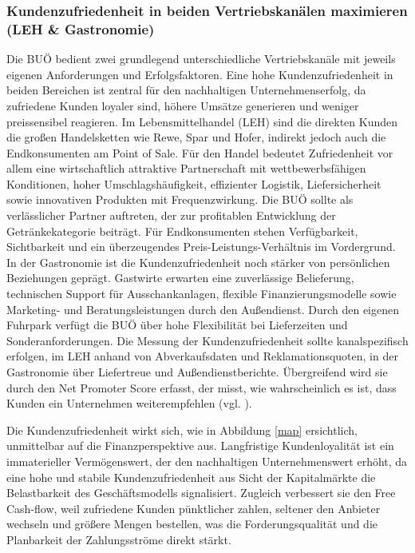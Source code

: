 \subsubsection{Kundenzufriedenheit in beiden Vertriebskanälen maximieren (LEH \& Gastronomie)}
Die BUÖ bedient zwei grundlegend unterschiedliche Vertriebskanäle mit jeweils eigenen Anforderungen und Erfolgsfaktoren. Eine hohe Kundenzufriedenheit in beiden Bereichen ist zentral für den nachhaltigen Unternehmenserfolg, da zufriedene Kunden loyaler sind, höhere Umsätze generieren und weniger preissensibel reagieren. Im Lebensmittelhandel (LEH) sind die direkten Kunden die großen Handelsketten wie Rewe, Spar und Hofer, indirekt jedoch auch die Endkonsumenten am Point of Sale. Für den Handel bedeutet Zufriedenheit vor allem eine wirtschaftlich attraktive Partnerschaft mit wettbewerbsfähigen Konditionen, hoher Umschlagshäufigkeit, effizienter Logistik, Liefersicherheit sowie innovativen Produkten mit Frequenzwirkung. Die BUÖ sollte als verlässlicher Partner auftreten, der zur profitablen Entwicklung der Getränkekategorie beiträgt. Für Endkonsumenten stehen Verfügbarkeit, Sichtbarkeit und ein überzeugendes Preis-Leistungs-Verhältnis im Vordergrund. In der Gastronomie ist die Kundenzufriedenheit noch stärker von persönlichen Beziehungen geprägt. Gastwirte erwarten eine zuverlässige Belieferung, technischen Support für Ausschankanlagen, flexible Finanzierungsmodelle sowie Marketing- und Beratungsleistungen durch den Außendienst. Durch den eigenen Fuhrpark verfügt die BUÖ über hohe Flexibilität bei Lieferzeiten und Sonderanforderungen. Die Messung der Kundenzufriedenheit sollte kanalspezifisch erfolgen, im LEH anhand von Abverkaufsdaten und Reklamationsquoten, in der Gastronomie über Liefertreue und Außendienstberichte. Übergreifend wird sie durch den Net Promoter Score erfasst, der misst, wie wahrscheinlich es ist, dass Kunden ein Unternehmen weiterempfehlen (vgl. \cite[S.1]{ardito_human-computer_2026}).

Die Kundenzufriedenheit wirkt sich, wie in Abbildung \ref{map} ersichtlich, unmittelbar auf die Finanzperspektive aus. Langfristige Kundenloyalität ist ein immaterieller Vermögenswert, der den nachhaltigen Unternehmenswert erhöht, da eine hohe und stabile Kundenzufriedenheit aus Sicht der Kapitalmärkte die Belastbarkeit des Geschäftsmodells signalisiert. Zugleich verbessert sie den Free Cash-flow, weil zufriedene Kunden pünktlicher zahlen, seltener den Anbieter wechseln und größere Mengen bestellen, was die Forderungsqualität und die Planbarkeit der Zahlungsströme direkt stärkt.

